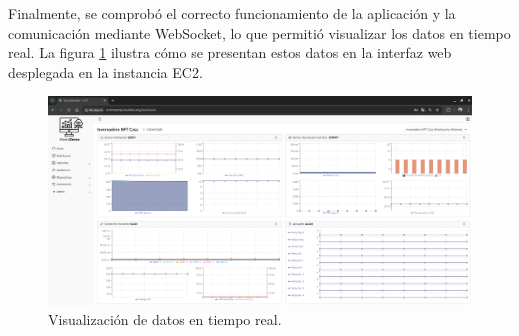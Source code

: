 Finalmente, se comprobó el correcto funcionamiento de la aplicación y la
comunicación mediante WebSocket, lo que permitió visualizar los datos en tiempo
real. La figura \ref{fig:aws-ec2-websocket} ilustra cómo se presentan estos
datos en la interfaz web desplegada en la instancia EC2.

\begin{figure}[H]
    \centering
    \includegraphics[width=\textwidth]{./Images/35-ec2-4.png}
    \caption{Visualización de datos en tiempo real.}
    \label{fig:aws-ec2-websocket}
\end{figure}

